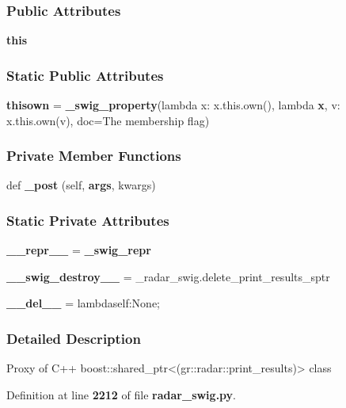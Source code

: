 \subsubsection*{Public Attributes}
\begin{DoxyCompactItemize}
\item 
{\bf this}
\end{DoxyCompactItemize}
\subsubsection*{Static Public Attributes}
\begin{DoxyCompactItemize}
\item 
{\bf thisown} = {\bf \+\_\+swig\+\_\+property}(lambda x\+: x.\+this.\+own(), lambda {\bf x}, v\+: x.\+this.\+own(v), doc=\textquotesingle{}The membership flag\textquotesingle{})
\end{DoxyCompactItemize}
\subsubsection*{Private Member Functions}
\begin{DoxyCompactItemize}
\item 
def {\bf \+\_\+post} (self, {\bf args}, kwargs)
\end{DoxyCompactItemize}
\subsubsection*{Static Private Attributes}
\begin{DoxyCompactItemize}
\item 
{\bf \+\_\+\+\_\+repr\+\_\+\+\_\+} = {\bf \+\_\+swig\+\_\+repr}
\item 
{\bf \+\_\+\+\_\+swig\+\_\+destroy\+\_\+\+\_\+} = \+\_\+radar\+\_\+swig.\+delete\+\_\+print\+\_\+results\+\_\+sptr
\item 
{\bf \+\_\+\+\_\+del\+\_\+\+\_\+} = lambdaself\+:\+None;
\end{DoxyCompactItemize}


\subsubsection{Detailed Description}
\begin{DoxyVerb}Proxy of C++ boost::shared_ptr<(gr::radar::print_results)> class\end{DoxyVerb}
 

Definition at line {\bf 2212} of file {\bf radar\+\_\+swig.\+py}.



